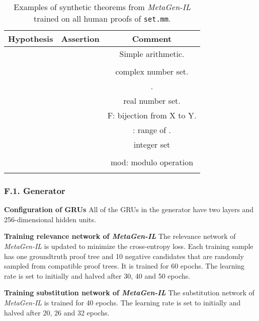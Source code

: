 \documentclass{article}
\begin{document}
\begin{table*}[t]
\caption{Examples of synthetic theorems from \textit{MetaGen-IL} trained on all human proofs of \texttt{set.mm}.}
\label{table:examples}
\begin{center}
\begin{small}
\begin{sc}
\begin{tabular}{c c c}
\toprule
\multicolumn{1}{c}{\bf  Hypothesis } 
&\multicolumn{1}{c}{\bf Assertion } 
&\multicolumn{1}{c}{\bf Comment}
\\ \midrule
 &  & Simple arithmetic.\\ 
\midrule
&  & \\ 
\midrule
 &  &  complex number set. \\
 &  & . \\  \midrule
 &  &   real number set.\\ \midrule
  & 
 
&F: bijection from X to Y. \\
&& : range of .\\ \midrule
 &   &  integer set \\ 
& &\\
\midrule
 & & mod: modulo operation \\
  && \\ 
\bottomrule
\end{tabular}
\end{sc}
\end{small}
\end{center}
\end{table*}

\subsubsection*{F.1. Generator}
\label{app:generator}
\noindent\textbf{Configuration of GRUs} All of the GRUs in the generator have two layers and 256-dimensional hidden units. 

\noindent\textbf{Training relevance network of \emph{MetaGen-IL}}
The relevance network of \emph{MetaGen-IL} is updated to minimize the cross-entropy loss. Each training sample has one groundtruth proof tree and 10 negative candidates that are randomly sampled
from compatible proof trees.
It is trained for 60 epochs.
The learning rate is set to  initially and halved
after 30, 40 and 50 epochs. 

\noindent\textbf{Training substitution network of \emph{MetaGen-IL}} The substitution network of \emph{MetaGen-IL} is trained for 40 epochs.
The learning rate is set to  initially and halved 
after 20, 26 and 32 epochs. 
\end{document}
